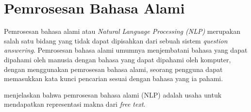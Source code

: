 \section{Pemrosesan Bahasa Alami}
Pemrosesan bahasa alami atau \emph{Natural Language Processing (NLP)} merupakan salah satu bidang yang tidak dapat dipisahkan dari sebuah sistem \emph{question answering}. Pemrosesan bahasa alami umumnya menjembatani bahasa yang dapat dipahami oleh manusia dengan bahasa yang dapat dipahami oleh komputer, dengan menggunakan pemrosesan bahasa alami, seorang pengguna dapat memasukkan kata kunci pencarian sesuai dengan bahasa yang ia pahami.

\citet*{kao_potet} menjelaskan bahwa pemrosesan bahasa alami (NLP) adalah usaha untuk mendapatkan representasi makna dari \emph{free text}.

